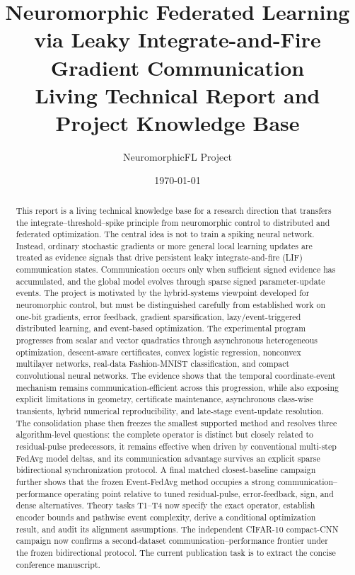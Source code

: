 \documentclass[11pt,a4paper]{article}
\title{Neuromorphic Federated Learning via Leaky Integrate-and-Fire Gradient Communication\\
\large Living Technical Report and Project Knowledge Base}
\author{NeuromorphicFL Project}
\date{\today}
\theoremstyle{remark}
\begin{document}
\maketitle

\begin{abstract}
This report is a living technical knowledge base for a research direction that transfers the integrate--threshold--spike principle from neuromorphic control to distributed and federated optimization. The central idea is not to train a spiking neural network. Instead, ordinary stochastic gradients or more general local learning updates are treated as evidence signals that drive persistent leaky integrate-and-fire (LIF) communication states. Communication occurs only when sufficient signed evidence has accumulated, and the global model evolves through sparse signed parameter-update events. The project is motivated by the hybrid-systems viewpoint developed for neuromorphic control, but must be distinguished carefully from established work on one-bit gradients, error feedback, gradient sparsification, lazy/event-triggered distributed learning, and event-based optimization. The experimental program progresses from scalar and vector quadratics through asynchronous heterogeneous optimization, descent-aware certificates, convex logistic regression, nonconvex multilayer networks, real-data Fashion-MNIST classification, and compact convolutional neural networks. The evidence shows that the temporal coordinate-event mechanism remains communication-efficient across this progression, while also exposing explicit limitations in geometry, certificate maintenance, asynchronous class-wise transients, hybrid numerical reproducibility, and late-stage event-update resolution. The consolidation phase then freezes the smallest supported method and resolves three algorithm-level questions: the complete operator is distinct but closely related to residual-pulse predecessors, it remains effective when driven by conventional multi-step FedAvg model deltas, and its communication advantage survives an explicit sparse bidirectional synchronization protocol. A final matched closest-baseline campaign further shows that the frozen Event-FedAvg method occupies a strong communication--performance operating point relative to tuned residual-pulse, error-feedback, sign, and dense alternatives. Theory tasks T1--T4 now specify the exact operator, establish encoder bounds and pathwise event complexity, derive a conditional optimization result, and audit its alignment assumptions. The independent CIFAR-10 compact-CNN campaign now confirms a second-dataset communication--performance frontier under the frozen bidirectional protocol. The current publication task is to extract the concise conference manuscript.
\end{abstract}
\end{document}
